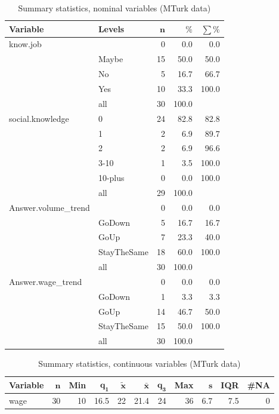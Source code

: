 \documentclass[a4paper,10pt]{article}\usepackage[]{graphicx}\usepackage[]{color}
\begin{document}
\begin{table}[ht]
\centering
{\footnotesize
\begin{tabular}{ll|rrr}
 \textbf{Variable} & \textbf{Levels} & $\mathbf{n}$ & $\mathbf{\%}$ & $\mathbf{\sum \%}$ \\ 
  \hline
know.job &  & 0 & 0.0 & 0.0 \\ 
   & Maybe & 15 & 50.0 & 50.0 \\ 
   & No & 5 & 16.7 & 66.7 \\ 
   & Yes & 10 & 33.3 & 100.0 \\ 
   \hline
 & all & 30 & 100.0 &  \\ 
   \hline
\hline
social.knowledge & 0 & 24 & 82.8 & 82.8 \\ 
   & 1 & 2 & 6.9 & 89.7 \\ 
   & 2 & 2 & 6.9 & 96.6 \\ 
   & 3-10 & 1 & 3.5 & 100.0 \\ 
   & 10-plus & 0 & 0.0 & 100.0 \\ 
   \hline
 & all & 29 & 100.0 &  \\ 
   \hline
\hline
Answer.volume\_trend &  & 0 & 0.0 & 0.0 \\ 
   & GoDown & 5 & 16.7 & 16.7 \\ 
   & GoUp & 7 & 23.3 & 40.0 \\ 
   & StayTheSame & 18 & 60.0 & 100.0 \\ 
   \hline
 & all & 30 & 100.0 &  \\ 
   \hline
\hline
Answer.wage\_trend &  & 0 & 0.0 & 0.0 \\ 
   & GoDown & 1 & 3.3 & 3.3 \\ 
   & GoUp & 14 & 46.7 & 50.0 \\ 
   & StayTheSame & 15 & 50.0 & 100.0 \\ 
   \hline
 & all & 30 & 100.0 &  \\ 
   \hline
\hline
\end{tabular}
}
\caption{Summary statistics, nominal variables (MTurk data)} 
\label{tab1:47-1010}
\end{table}
\begin{table}[ht]
\centering
{\footnotesize
\begin{tabular}{lrrrrrrrrrr}
 \textbf{Variable} & $\mathbf{n}$ & \textbf{Min} & $\mathbf{q_1}$ & $\mathbf{\widetilde{x}}$ & $\mathbf{\bar{x}}$ & $\mathbf{q_3}$ & \textbf{Max} & $\mathbf{s}$ & \textbf{IQR} & \textbf{\#NA} \\ 
  \hline
wage & 30 & 10 & 16.5 & 22 & 21.4 & 24 & 36 & 6.7 & 7.5 & 0 \\ 
  \end{tabular}
}
\caption{Summary statistics, continuous variables (MTurk data)} 
\label{tab2:47-1010}
\end{table}
\end{document}
